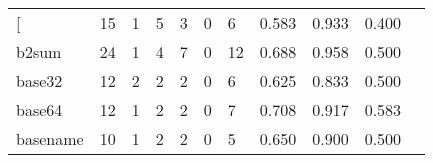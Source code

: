 \begin{longtable}{lp{1.2cm}p{1.2cm}p{1.2cm}p{1.2cm}p{1.2cm}p{1.2cm}p{1.2cm}p{1.2cm}p{1.2cm}p{1.2cm}}
\bottomrule
\endlastfoot
{[}         &                                    15 &                                                  1 &                                                  5 &                                                  3 &                                                  0 &                                                  6 &                                              0.583 &                                              0.933 &                                              0.400 \\
b2sum     &                                    24 &                                                  1 &                                                  4 &                                                  7 &                                                  0 &                                                 12 &                                              0.688 &                                              0.958 &                                              0.500 \\
base32    &                                    12 &                                                  2 &                                                  2 &                                                  2 &                                                  0 &                                                  6 &                                              0.625 &                                              0.833 &                                              0.500 \\
base64    &                                    12 &                                                  1 &                                                  2 &                                                  2 &                                                  0 &                                                  7 &                                              0.708 &                                              0.917 &                                              0.583 \\
basename  &                                    10 &                                                  1 &                                                  2 &                                                  2 &                                                  0 &                                                  5 &                                              0.650 &                                              0.900 &                                              0.500 \\

\end{longtable}
